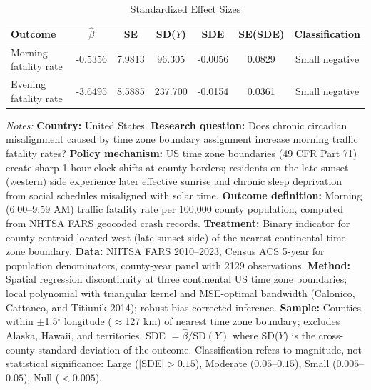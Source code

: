 \begin{table}[htbp]
\centering
\caption{Standardized Effect Sizes}
\label{tab:sde}
\begin{threeparttable}
\begin{tabular}{lcccccc}
\toprule
Outcome & $\hat{\beta}$ & SE & SD($Y$) & SDE & SE(SDE) & Classification \\
\midrule
Morning fatality rate & -0.5356 & 7.9813 & 96.305 & -0.0056 & 0.0829 & Small negative \\
Evening fatality rate & -3.6495 & 8.5885 & 237.700 & -0.0154 & 0.0361 & Small negative \\
\bottomrule
\end{tabular}
\begin{tablenotes}[flushleft]\small
\item \textit{Notes:} \textbf{Country:} United States. \textbf{Research question:} Does chronic circadian misalignment caused by time zone boundary assignment increase morning traffic fatality rates? \textbf{Policy mechanism:} US time zone boundaries (49 CFR Part 71) create sharp 1-hour clock shifts at county borders; residents on the late-sunset (western) side experience later effective sunrise and chronic sleep deprivation from social schedules misaligned with solar time. \textbf{Outcome definition:} Morning (6:00--9:59 AM) traffic fatality rate per 100,000 county population, computed from NHTSA FARS geocoded crash records. \textbf{Treatment:} Binary indicator for county centroid located west (late-sunset side) of the nearest continental time zone boundary. \textbf{Data:} NHTSA FARS 2010--2023, Census ACS 5-year for population denominators, county-year panel with 2129 observations. \textbf{Method:} Spatial regression discontinuity at three continental US time zone boundaries; local polynomial with triangular kernel and MSE-optimal bandwidth (Calonico, Cattaneo, and Titiunik 2014); robust bias-corrected inference. \textbf{Sample:} Counties within $\pm$1.5$^\circ$ longitude ($\approx$127 km) of nearest time zone boundary; excludes Alaska, Hawaii, and territories. SDE $= \hat{\beta} / \text{SD}(Y)$ where SD($Y$) is the cross-county standard deviation of the outcome. Classification refers to magnitude, not statistical significance: Large ($|$SDE$| > 0.15$), Moderate ($0.05$--$0.15$), Small ($0.005$--$0.05$), Null ($< 0.005$).
\end{tablenotes}
\end{threeparttable}
\end{table}

